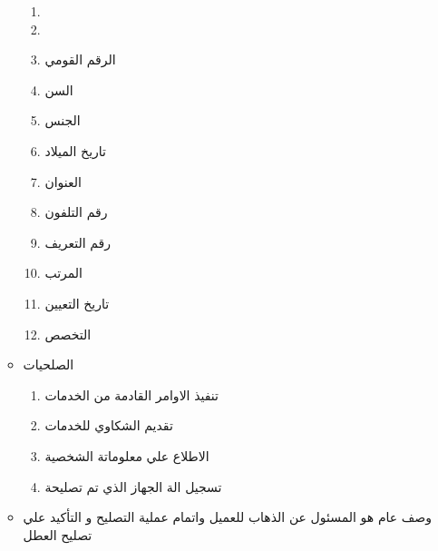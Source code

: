 \documentclass[25pt]{article}
\begin{document}
\begin{itemize}
\begin{itemize}
\begin{enumerate}
				\item{}
				\item{}
				\item الرقم القومي
				\item السن
				\item الجنس
				\item تاريخ الميلاد
				\item العنوان 
				\item رقم التلفون
				\item رقم التعريف 
				\item المرتب
				\item تاريخ التعيين 
				\item التخصص
			\end{enumerate}
			\item الصلحيات
			\begin{enumerate}
				\item تنفيذ الاوامر القادمة من الخدمات
				\item تقديم الشكاوي  للخدمات   
				\item الاطلاع علي معلوماتة الشخصية 
				\item تسجيل الة الجهاز الذي تم تصليحة
				\newline
			\end{enumerate}
			\item وصف عام 
			\newline
			هو المسئول عن الذهاب للعميل واتمام عملية التصليح و التأكيد علي تصليح العطل 
			\newline
			\newline
		\end{itemize}
		

\end{itemize}
\end{document}
